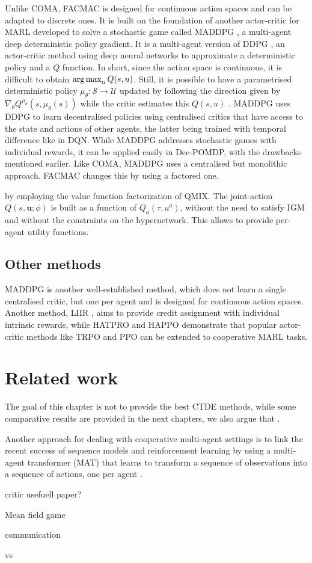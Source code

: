 Unlike COMA, FACMAC is designed for continuous action spaces and can be adapted to discrete ones.
It is built on the foundation of another actor-critic for MARL developed to solve a stochastic game called MADDPG \citep{lowe2017multi}, a multi-agent deep deterministic policy gradient.
It is a multi-agent version of DDPG \citep{lillicrap2015continuous}, an actor-critic method using deep neural networks to approximate a deterministic policy and a $Q$ function.
In short, since the action space is continuous, it is difficult to obtain $\operatorname*{arg\,max}_u Q(s, u)$. Still, it is possible to have a parametrised deterministic policy $\mu_\theta:\mathcal{S}\rightarrow\mathcal{U}$ updated by following the direction given by $\nabla_\theta Q^{\mu_\theta}(s, \mu_\theta(s))$ while the critic estimates this $Q(s, u)$ \citep{silver2014deterministic}.
MADDPG uses DDPG to learn decentralised policies using centralised critics that have access to the state and actions of other agents, the latter being trained with temporal difference like in DQN.
While MADDPG addresses stochastic games with individual rewards, it can be applied easily in Dec-POMDP, with the drawbacks mentioned earlier.
Like COMA, MADDPG uses a centralised but monolithic approach.
FACMAC changes this by using a factored one.


by employing the value function factorization of QMIX.
The joint-action $Q(s, \boldsymbol{u};\phi)$ is built as a function of $Q_a(\tau, u^a)$, without the need to satisfy IGM and without the constraints on the hypernetwork.
This allows to provide per-agent utility functions.


\subsection{Other methods}
MADDPG \citep{lowe2017multi} is another well-established method, which does not learn a single centralised critic, but one per agent and is designed for continuous action spaces.
Another method, LIIR \citep{Du2019LIIRLearning}, aims to provide credit assignment with individual intrinsic rewards, while HATPRO and HAPPO \citep{kuba2021trust} demonstrate that popular actor-critic methods like TRPO \citep{schulman2015trust} and PPO \citep{schulman2017ppo} can be extended to cooperative MARL tasks.

\section{Related work}
The goal of this chapter is not to provide the best CTDE methods, while some comparative results are provided in the next chapters, we also argue that \citep{gorsane2022towards}.

Another approach for dealing with cooperative multi-agent settings is to link the recent success of sequence models and reinforcement learning by using a multi-agent transformer (MAT) that learns to transform a sequence of observations into a sequence of actions, one per agent \citep{wen2022multiagent}.

critic usefuell paper?

Mean field game

communication

\citep{lyu2021contrasting} vs \citep{peng2021facmac}
